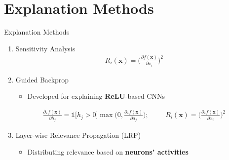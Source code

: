 \documentclass[Nike]{tuberlinbeamer}
\newcommand{\x}[0]{\boldsymbol{x}}
\newcommand{\ppartial}[2]{\frac{\partial #1}{\partial #2}}
\begin{document}
\section{Explanation Methods}
\begin{frame}[allowframebreaks=0.95,t]{Explanation Methods}

\begin{enumerate}
	\item Sensitivity Analysis \citep{SimonyanDeepConvolutionalNetworks2013}
			\begin{align*}
				R_i(\x) = \bigg ( \ppartial{f(\x)}{x_i} \bigg )^2
			\end{align*}
	\item Guided Backprop \citep{SpringenbergStrivingSimplicityAll2015a} \\
		\begin{itemize}
			\item Developed for explaining \textbf{ReLU}-based CNNs
		\end{itemize}
				\begin{align*}
				\frac{\partial_{*} f(\x) }{\partial h_j} = \mathds{1} \bigg[  h_j > 0 \bigg]\max\bigg( 0, \frac{\partial_{*} f(\x) }{\partial a_j} \bigg);\hspace{1cm} R_i(\x) = \bigg( \frac{\partial_{*} f(\x) }{\partial x_i} \bigg )^2
			\end{align*}
	\framebreak
	
	\item Layer-wise Relevance Propagation (LRP) \citep{BinderLayerWiseRelevancePropagation2016} 
		\begin{itemize}
			\item Distributing relevance based on \textbf{neurons' activities}
			\begin{columns}
\end{columns}
\end{itemize}
\end{enumerate}
\end{frame}
\end{document}

